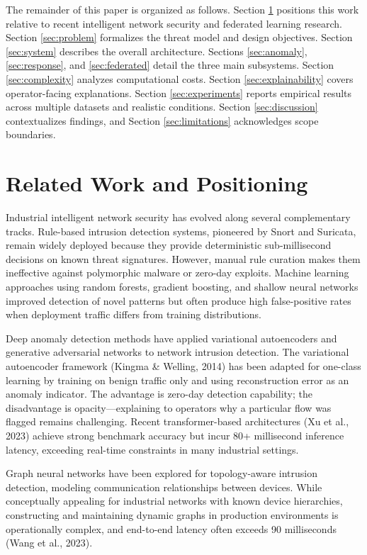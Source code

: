 \documentclass[preprint,12pt]{elsarticle}
\begin{document}
The remainder of this paper is organized as follows. Section \ref{sec:related} positions this work relative to recent intelligent network security and federated learning research. Section \ref{sec:problem} formalizes the threat model and design objectives. Section \ref{sec:system} describes the overall architecture. Sections \ref{sec:anomaly}, \ref{sec:response}, and \ref{sec:federated} detail the three main subsystems. Section \ref{sec:complexity} analyzes computational costs. Section \ref{sec:explainability} covers operator-facing explanations. Section \ref{sec:experiments} reports empirical results across multiple datasets and realistic conditions. Section \ref{sec:discussion} contextualizes findings, and Section \ref{sec:limitations} acknowledges scope boundaries.

\section{Related Work and Positioning}
\label{sec:related}

Industrial intelligent network security has evolved along several complementary tracks. Rule-based intrusion detection systems, pioneered by Snort and Suricata, remain widely deployed because they provide deterministic sub-millisecond decisions on known threat signatures. However, manual rule curation makes them ineffective against polymorphic malware or zero-day exploits. Machine learning approaches using random forests, gradient boosting, and shallow neural networks improved detection of novel patterns but often produce high false-positive rates when deployment traffic differs from training distributions.

Deep anomaly detection methods have applied variational autoencoders and generative adversarial networks to network intrusion detection. The variational autoencoder framework (Kingma \& Welling, 2014) has been adapted for one-class learning by training on benign traffic only and using reconstruction error as an anomaly indicator. The advantage is zero-day detection capability; the disadvantage is opacity---explaining to operators why a particular flow was flagged remains challenging. Recent transformer-based architectures (Xu et al., 2023) achieve strong benchmark accuracy but incur 80+ millisecond inference latency, exceeding real-time constraints in many industrial settings.

Graph neural networks have been explored for topology-aware intrusion detection, modeling communication relationships between devices. While conceptually appealing for industrial networks with known device hierarchies, constructing and maintaining dynamic graphs in production environments is operationally complex, and end-to-end latency often exceeds 90 milliseconds (Wang et al., 2023).
\end{document}
